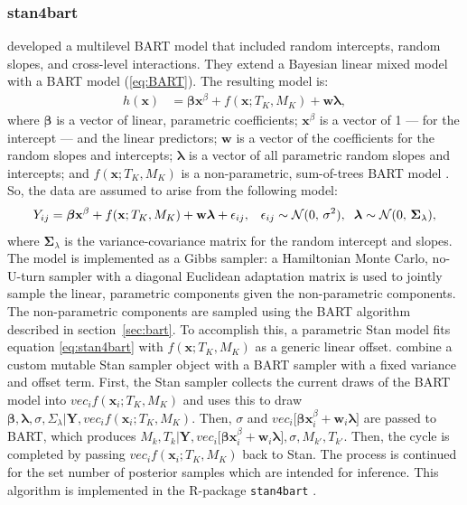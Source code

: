 \documentclass[10pt, a4paper, titlepage]{article}
\begin{document}
\subsubsection{stan4bart}
\citet{dorie2022} developed a multilevel BART model that included random intercepts, random slopes, and cross-level interactions. They extend a Bayesian linear mixed model with a BART model (\ref{eq:BART}). The resulting model is:
\begin{align}
    \label{eq:stan4bart}
    h(\textbf{x}) &= \boldsymbol{\beta}\mathbf{x}^{\beta} + f(\mathbf{x}; T_{K}, M_{K}) + \mathbf{w}\boldsymbol{\lambda},
\end{align} where $\boldsymbol{\beta}$ is a vector of linear, parametric coefficients; $\mathbf{x}^{\beta}$ is a vector of 1 --- for the intercept --- and the linear predictors; $\mathbf{w}$ is a vector of the coefficients for the random slopes and intercepts; $\boldsymbol{\lambda}$ is a vector of all parametric random slopes and intercepts; and $f(\mathbf{x}; T_{K}, M_{K})$ is a non-parametric, sum-of-trees BART model \citep{dorie2022}. So, the data are assumed to arise from the following model:
\begin{align}
    \label{eq:stan4bart_model}
    Y_{ij} = \boldsymbol{\beta}\mathbf{x}^{\beta} + f(\mathbf{x}; T_{K}, M_{K}) + \mathbf{w}\boldsymbol{\lambda} + \epsilon_{ij}, & &\epsilon_{ij} \sim \mathcal{N}(0,\,\sigma^{2}), \hspace{.2cm} \boldsymbol{\lambda} \sim \mathcal{N}(0,\,\boldsymbol{\Sigma}_{\lambda}),
\end{align} where $\boldsymbol{\Sigma}_{\lambda}$ is the variance-covariance matrix for the random intercept and slopes. The model is implemented as a Gibbs sampler: a  Hamiltonian Monte Carlo, no-U-turn sampler with a diagonal Euclidean adaptation matrix is used to jointly sample the linear, parametric components given the non-parametric components. The non-parametric components are sampled using the BART algorithm described in section~\ref{sec:bart}. To accomplish this, a parametric Stan model \citep{lee2017} fits equation \ref{eq:stan4bart} with $f(\mathbf{x}; T_{K}, M_{K})$ as a generic linear offset. \citet{dorie2022} combine a custom mutable Stan sampler object with a BART sampler with a fixed variance and offset term. First, the Stan sampler collects the current draws of the BART model into $vec_if(\mathbf{x}_{i}; T_{K}, M_{K})$ and uses this to draw $\mathbf{\beta}, \mathbf{\lambda}, \sigma, \Sigma_\lambda | \mathbf{Y}, vec_if(\mathbf{x}_{i}; T_{K}, M_{K})$. Then, $\sigma$ and $vec_i\big[\boldsymbol{\beta}\mathbf{x}_i^{\beta} + \mathbf{w}_i\boldsymbol{\lambda}\big]$ are passed to BART, which produces $M_k,T_k | \mathbf{Y}, vec_i\big[\boldsymbol{\beta}\mathbf{x}_i^{\beta} + \mathbf{w}_i\boldsymbol{\lambda}\big], \sigma, M_{k'}, T_{k'}$. Then, the cycle is completed by passing $vec_if(\mathbf{x}_{i}; T_{K}, M_{K})$ back to Stan. The process is continued for the set number of posterior samples which are intended for inference. This algorithm is implemented in the R-package \texttt{stan4bart} \citep{dorie2023a}.
\end{document}
